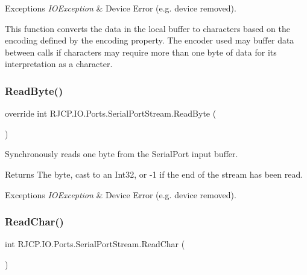\begin{DoxyExceptions}{Exceptions}
{\em I\+O\+Exception} & Device Error (e.\+g. device removed).\\
\hline
\end{DoxyExceptions}


This function converts the data in the local buffer to characters based on the encoding defined by the encoding property. The encoder used may buffer data between calls if characters may require more than one byte of data for its interpretation as a character. \mbox{\label{class_r_j_c_p_1_1_i_o_1_1_ports_1_1_serial_port_stream_a1cb47a9fdfcd3a52c715385f774fc43a}} 
\subsubsection{\texorpdfstring{ReadByte()}{ReadByte()}}
{\footnotesize\ttfamily override int R\+J\+C\+P.\+I\+O.\+Ports.\+Serial\+Port\+Stream.\+Read\+Byte (\begin{DoxyParamCaption}{ }\end{DoxyParamCaption})}



Synchronously reads one byte from the Serial\+Port input buffer. 

\begin{DoxyReturn}{Returns}
The byte, cast to an Int32, or -\/1 if the end of the stream has been read.
\end{DoxyReturn}

\begin{DoxyExceptions}{Exceptions}
{\em I\+O\+Exception} & Device Error (e.\+g. device removed).\\
\hline
\end{DoxyExceptions}
\mbox{\label{class_r_j_c_p_1_1_i_o_1_1_ports_1_1_serial_port_stream_af756a8f941088f1509b99fefcf7ecdcb}} 
\subsubsection{\texorpdfstring{ReadChar()}{ReadChar()}}
{\footnotesize\ttfamily int R\+J\+C\+P.\+I\+O.\+Ports.\+Serial\+Port\+Stream.\+Read\+Char (\begin{DoxyParamCaption}{ }\end{DoxyParamCaption})}



